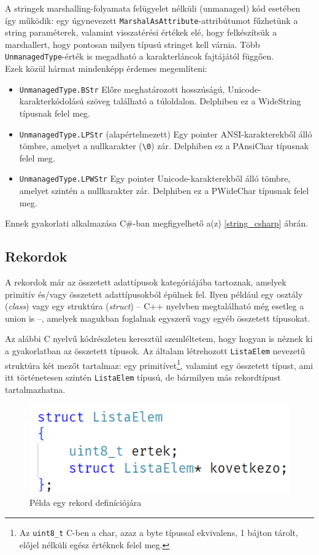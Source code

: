 \documentclass[tocnopagenum]{thesis-ekf}
\begin{document}
	A stringek marshalling-folyamata felügyelet nélküli (unmanaged) kód esetében így működik: egy úgynevezett \verb*|MarshalAsAttribute|-attribútumot fűzhetünk a string paraméterek, valamint visszatérési értékek elé, hogy felkészítsük a marshallert, hogy pontosan milyen típusú stringet kell várnia. Több \verb*|UnmanagedType|-érték is megadható a karakterláncok fajtájától függően.\cite{marshalling_strings}\\
	Ezek közül hármat mindenképp érdemes megemlíteni:
	\begin{itemize}
		\item \verb*|UnmanagedType.BStr| Előre meghatározott hosszúságú, Unicode-karakterkódolású szöveg található a túloldalon. Delphiben ez a WideString típusnak felel meg.
		\item \verb*|UnmanagedType.LPStr| (alapértelmezett) Egy pointer ANSI-karakterekből álló tömbre, amelyet a nullkarakter (\verb*|\0|) zár. Delphiben ez a PAnsiChar típusnak felel meg. 
		\item \verb*|UnmanagedType.LPWStr| Egy pointer Unicode-karakterekből álló tömbre, amelyet szintén a nullkarakter zár. Delphiben ez a PWideChar típusnak felel meg.
	\end{itemize}
	Ennek gyakorlati alkalmazása C\#-ban megfigyelhető a(z) \ref{string_csharp} ábrán.
	\subsection{Rekordok}
	A rekordok már az összetett adattípusok kategóriájába tartoznak, amelyek primitív és/vagy összetett adattípusokból épülnek fel. Ilyen például egy osztály (\textit{class}) vagy egy struktúra (\textit{struct}) -- C++ nyelvben megtalálható még esetleg a union is --, amelyek magukban foglalnak egyszerű vagy egyéb összetett típusokat.
	
	Az alábbi C nyelvű kódrészleten keresztül szemléltetem, hogy hogyan is néznek ki a gyakorlatban az összetett típusok. Az általam létrehozott \verb*|ListaElem| nevezetű struktúra két mezőt tartalmaz: egy primitívet\footnote{Az \verb*|uint8_t| C-ben a char, azaz a byte típussal ekvivalens, 1 bájton tárolt, előjel nélküli egész értéknek felel meg.}, valamint egy összetett típust, ami itt történetesen szintén \verb*|ListaElem| típusú, de bármilyen más rekordtípust tartalmazhatna.
	\begin{figure}[H]
		\centering
		\includegraphics[scale=0.65]{linkedlist_struct}
		\caption{Példa egy rekord definíciójára}
		\label{fig:linkedlist_struct}
	\end{figure}
	
\end{document}
